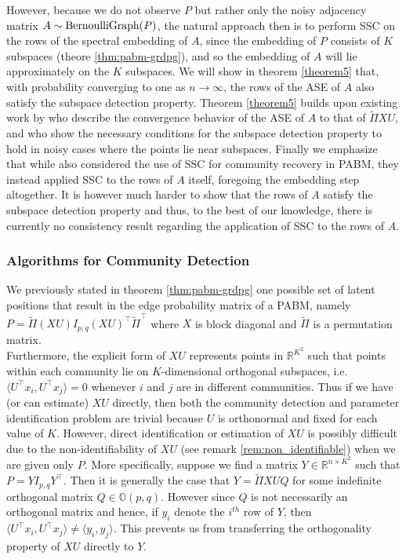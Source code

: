 \documentclass[
  11pt,
]{article}
\theoremstyle{definition}
\theoremstyle{definition}
\theoremstyle{definition}
\theoremstyle{definition}
\theoremstyle{remark}
\begin{document}
However, because we do not observe \(P\) but rather only the noisy
adjacency matrix \(A \sim \mathrm{BernoulliGraph}(P)\), the natural approach then is
to perform SSC on the rows of the spectral embedding of \(A\),
since the embedding of \(P\) consists of \(K\) subspaces (theore \ref{thm:pabm-grdpg}),
and so the embedding of \(A\) will lie approximately on the \(K\) subspaces.
We will show in theorem \ref{theorem5} that, with probability converging to
one as \(n \rightarrow \infty\), the rows of the ASE of \(A\) also
satisfy the subspace detection property.
Theorem \ref{theorem5} builds upon existing work by
\citet{rubindelanchy2017statistical} who describe the convergence
behavior of the ASE of \(A\) to that of \(\tilde{\Pi} XU\), and
\citet{jmlr-v28-wang13} who show the necessary conditions for the
subspace detection property to hold in noisy cases where the points lie
near subspaces. Finally we emphasize that while
\citet{noroozi2019estimation} also considered the use of SSC for
community recovery in PABM, they instead applied SSC to the rows of
\(A\) itself, foregoing
the embedding step altogether. It is however much harder to show that
the rows of \(A\) satisfy the subspace detection property and thus, to
the best of our knowledge, there is currently no consistency result
regarding the application of SSC to the rows of \(A\).

\hypertarget{algorithms-for-community-detection}{%
\subsubsection{Algorithms for Community Detection}\label{algorithms-for-community-detection}}

We previously stated in theorem \ref{thm:pabm-grdpg} one possible set of latent positions that result in
the edge probability matrix of a PABM, namely
\(P = \tilde{\Pi} (XU) I_{p, q} (XU)^\top \tilde{\Pi}^{\top}\) where \(X\) is block diagonal and
\(\tilde{\Pi}\) is a permutation matrix.\\
Furthermore, the explicit form of \(XU\) represents points in \(\mathbb{R}^{K^2}\)
such that points within each community lie on \(K\)-dimensional
orthogonal subspaces, i.e.~\(\langle U^{\top} x_i, U^{\top} x_j \rangle = 0\) whenever \(i\) and \(j\) are in different communities.
Thus if we have (or can estimate) \(XU\) directly, then both the community
detection and parameter identification problem are trivial because \(U\)
is orthonormal and fixed for each value of \(K\).
However, direct
identification or estimation of \(XU\) is possibly difficult
due to the non-identifiability of \(XU\) (see remark \ref{rem:non_identifiable})
when we are given only \(P\).
More specifically, suppose we find a matrix \(Y \in \mathbb{R}^{n \times K^2}\)
such that \(P = Y I_{p, q} Y^\top\). Then it is generally the case that
\(Y = \tilde{\Pi} XU Q\) for some indefinite orthogonal matrix
\(Q \in \mathbb{O}(p,q)\).
However since \(Q\) is not necessarily an
orthogonal matrix and hence, if \(y_i\) denote the \(i^{th}\) row of \(Y\),
then \(\langle U^{\top} x_i, U^{\top} x_j \rangle \neq \langle y_i, y_j \rangle\).
This prevents us from transferring the orthogonality property of
\(XU\) directly to \(Y\).
\end{document}
